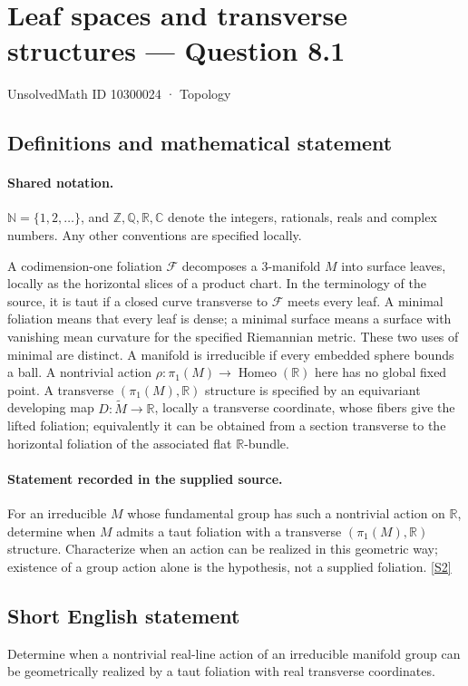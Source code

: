 \documentclass[11pt]{article}
\newcommand{\sref}[2]{\hyperlink{source:#1:#2}{[S#2]}}
\begin{document}
\setcounter{section}{10300023}
\section{Leaf spaces and transverse structures — Question 8.1}\label{10300024}
{\small\sffamily UnsolvedMath ID 10300024 · Topology}
\subsection{Definitions and mathematical statement}

\paragraph{Shared notation.}$\mathbb N=\{1,2,\ldots\}$, and $\mathbb Z,\mathbb Q,\mathbb R,\mathbb C$ denote the integers, rationals, reals and complex numbers. Any other conventions are specified locally.


A codimension-one foliation $\mathcal F$ decomposes a $3$-manifold $M$ into surface leaves, locally as the horizontal slices of a product chart. In the terminology of the source, it is taut if a closed curve transverse to $\mathcal F$ meets every leaf. A minimal foliation means that every leaf is dense; a minimal surface means a surface with vanishing mean curvature for the specified Riemannian metric. These two uses of minimal are distinct. A manifold is irreducible if every embedded sphere bounds a ball. A nontrivial action $\rho:\pi_1(M)\to\operatorname{Homeo}(\mathbb R)$ here has no global fixed point. A transverse $(\pi_1(M),\mathbb R)$ structure is specified by an equivariant developing map $D:\widetilde M\to\mathbb R$, locally a transverse coordinate, whose fibers give the lifted foliation; equivalently it can be obtained from a section transverse to the horizontal foliation of the associated flat $\mathbb R$-bundle.
\paragraph{Statement recorded in the supplied source.}
For an irreducible $M$ whose fundamental group has such a nontrivial action on $\mathbb R$, determine when $M$ admits a taut foliation with a transverse $(\pi_1(M),\mathbb R)$ structure. Characterize when an action can be realized in this geometric way; existence of a group action alone is the hypothesis, not a supplied foliation. \sref{10300024}{2}
\subsection{Short English statement}
Determine when a nontrivial real-line action of an irreducible manifold group can be geometrically realized by a taut foliation with real transverse coordinates.
\end{document}
